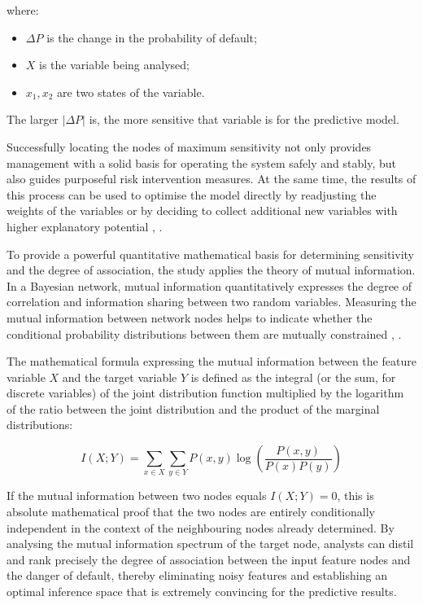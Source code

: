 \noindent
where:
\begin{itemize}
    \item $\Delta P$ is the change in the probability of default;
    \item $X$ is the variable being analysed;
    \item $x_1,x_2$ are two states of the variable.

\end{itemize}

\noindent
The larger $|\Delta P|$ is, the more sensitive that variable is for the predictive model.

\vspace{1em}
Successfully locating the nodes of maximum sensitivity not only provides management with a solid basis for operating the system safely and stably, but also guides purposeful risk intervention measures. At the same time, the results of this process can be used to optimise the model directly by readjusting the weights of the variables or by deciding to collect additional new variables with higher explanatory potential \cite{lin2020behavioral}, \cite{bishop2006pattern} .

To provide a powerful quantitative mathematical basis for determining sensitivity and the degree of association, the study applies the theory of mutual information. In a Bayesian network, mutual information quantitatively expresses the degree of correlation and information sharing between two random variables. Measuring the mutual information between network nodes helps to indicate whether the conditional probability distributions between them are mutually constrained \cite{murphy2012machine}, \cite{cover2006elements}. 

The mathematical formula expressing the mutual information between the feature variable $X$ and the target variable $Y$ is defined as the integral (or the sum, for discrete variables) of the joint distribution function multiplied by the logarithm of the ratio between the joint distribution and the product of the marginal distributions:

\begin{equation}
    I(X;Y) = \sum_{x \in X} \sum_{y \in Y} P(x,y) \log \left( \frac{P(x,y)}{P(x)P(y)} \right)
\end{equation}

\vspace{1em}
If the mutual information between two nodes equals $I(X;Y) = 0$, this is absolute mathematical proof that the two nodes are entirely conditionally independent in the context of the neighbouring nodes already determined. By analysing the mutual information spectrum of the target node, analysts can distil and rank precisely the degree of association between the input feature nodes and the danger of default, thereby eliminating noisy features and establishing an optimal inference space that is extremely convincing for the predictive results.


